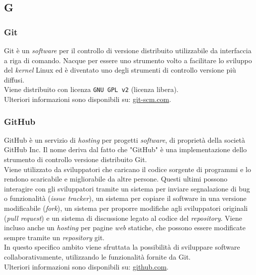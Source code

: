 \subsection{G}

\subsubsection{Git}
Git è un \textit{software} per il controllo di versione distribuito utilizzabile da interfaccia a riga di comando.
Nacque per essere uno strumento volto a facilitare lo sviluppo del \textit{kernel} Linux ed è diventato uno degli strumenti di controllo versione più diffusi.\\
Viene distribuito con licenza \texttt{GNU GPL v2} (licenza libera). \\
Ulteriori informazioni sono disponibili su: \href{https://git-scm.com/}{git-scm.com}.

\subsubsection{GitHub}
GitHub è un servizio di \textit{hosting} per progetti \textit{software}, di proprietà della società GitHub Inc.
Il nome deriva dal fatto che "GitHub" è una implementazione dello strumento di controllo versione distribuito Git\g. \\
Viene utilizzato da sviluppatori che caricano il codice sorgente di programmi e lo rendono scaricabile e migliorabile da altre persone. 
Questi ultimi possono interagire con gli sviluppatori tramite un sistema per inviare segnalazione di bug o funzionalità (\textit{issue tracker}), un sistema per copiare il software in una versione modificabile (\textit{fork}), un sistema per proporre modifiche agli sviluppatori originali (\textit{pull request}) e un sistema di discussione legato al codice del \textit{repository}. 
Viene incluso anche un \textit{hosting} per pagine \textit{web} statiche, che possono essere modificate sempre tramite un \textit{repository} git.\\
In questo specifico ambito viene sfruttata la possibilità di sviluppare software collaborativamente, utilizzando le funzionalità fornite da Git\g. \\
Ulteriori informazioni sono disponibili su: \href{https://github.com/}{github.com}.